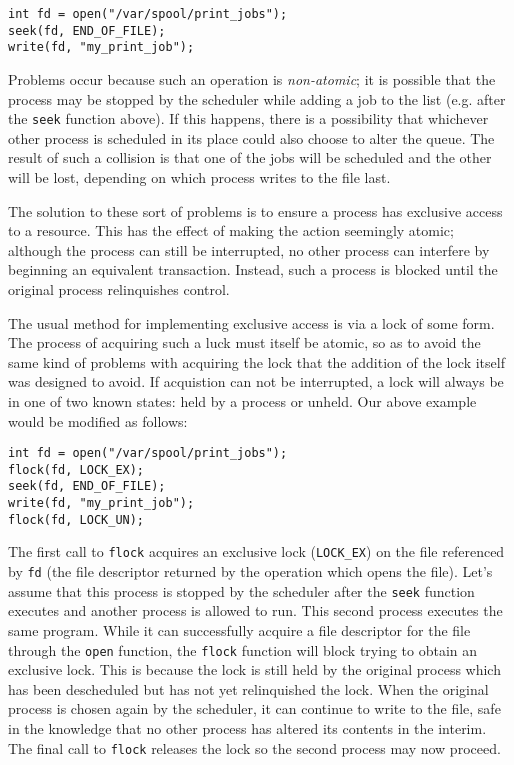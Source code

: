 \begin{verbatim}
int fd = open("/var/spool/print_jobs");
seek(fd, END_OF_FILE);
write(fd, "my_print_job");
\end{verbatim}

Problems occur because such an operation is \emph{non-atomic}; it is
possible that the process may be stopped by the scheduler while adding
a job to the list (e.g. after the \texttt{seek} function above).  If
this happens, there is a possibility that whichever other process is
scheduled in its place could also choose to alter the queue.  The
result of such a collision is that one of the jobs will be scheduled
and the other will be lost, depending on which process writes to the
file last.

The solution to these sort of problems is to ensure a process has
exclusive access to a resource.  This has the effect of making the
action seemingly atomic; although the process can still be
interrupted, no other process can interfere by beginning an equivalent
transaction.  Instead, such a process is blocked until the original
process relinquishes control.

The usual method for implementing exclusive access is via a lock of
some form.  The process of acquiring such a luck must itself be
atomic, so as to avoid the same kind of problems with acquiring the
lock that the addition of the lock itself was designed to avoid.  If
acquistion can not be interrupted, a lock will always be in one of two
known states: held by a process or unheld.  Our above example would be
modified as follows:

\begin{verbatim}
int fd = open("/var/spool/print_jobs");
flock(fd, LOCK_EX);
seek(fd, END_OF_FILE);
write(fd, "my_print_job");
flock(fd, LOCK_UN);
\end{verbatim}

The first call to \texttt{flock} acquires an exclusive lock
(\texttt{LOCK\_EX}) on the file referenced by \texttt{fd} (the file
descriptor returned by the operation which opens the file).  Let's
assume that this process is stopped by the scheduler after the
\texttt{seek} function executes and another process is allowed to run.
This second process executes the same program.  While it can
successfully acquire a file descriptor for the file through the
\texttt{open} function, the \texttt{flock} function will block trying
to obtain an exclusive lock.  This is because the lock is still held
by the original process which has been descheduled but has not yet
relinquished the lock.  When the original process is chosen again by
the scheduler, it can continue to write to the file, safe in the
knowledge that no other process has altered its contents in the
interim.  The final call to \texttt{flock} releases the lock so the
second process may now proceed.

